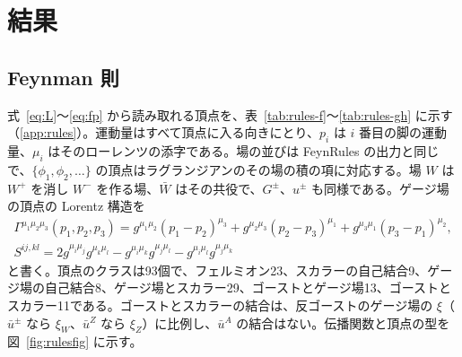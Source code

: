 \documentclass[a4paper,10pt]{ltjsarticle}
\begin{document}
\section{結果}\label{sec:results}

\subsection{Feynman 則}\label{sec:rules}

式~\eqref{eq:L}〜\eqref{eq:fp} から読み取れる頂点を、表~\ref{tab:rules-f}〜\ref{tab:rules-gh} に示す（\ref{app:rules}）。運動量はすべて頂点に入る向きにとり、$p_i$ は $i$ 番目の脚の運動量、$\mu_i$ はそのローレンツの添字である。場の並びは FeynRules の出力と同じで、$\{\phi_1,\phi_2,\dots\}$ の頂点はラグランジアンのその場の積の項に対応する。場 $W$ は $W^+$ を消し $W^-$ を作る場、$\bar W$ はその共役で、$G^\pm$、$u^\pm$ も同様である。ゲージ場の頂点の Lorentz 構造を
\begin{equation}
\begin{gathered}
\Gamma^{\mu_1\mu_2\mu_3}(p_1,p_2,p_3)=g^{\mu_1\mu_2}(p_1-p_2)^{\mu_3}+g^{\mu_2\mu_3}(p_2-p_3)^{\mu_1}+g^{\mu_3\mu_1}(p_3-p_1)^{\mu_2},\\
S^{ij,kl}=2g^{\mu_i\mu_j}g^{\mu_k\mu_l}-g^{\mu_i\mu_k}g^{\mu_j\mu_l}-g^{\mu_i\mu_l}g^{\mu_j\mu_k}
\end{gathered}
\label{eq:GammaS}
\end{equation}
と書く。頂点のクラスは93個で、フェルミオン23、スカラーの自己結合9、ゲージ場の自己結合8、ゲージ場とスカラー29、ゴーストとゲージ場13、ゴーストとスカラー11である。ゴーストとスカラーの結合は、反ゴーストのゲージ場の $\xi$（$\bar u^\pm$ なら $\xi_W$、$\bar u^Z$ なら $\xi_Z$）に比例し、$\bar u^A$ の結合はない。伝播関数と頂点の型を図~\ref{fig:rulesfig} に示す。
\end{document}
